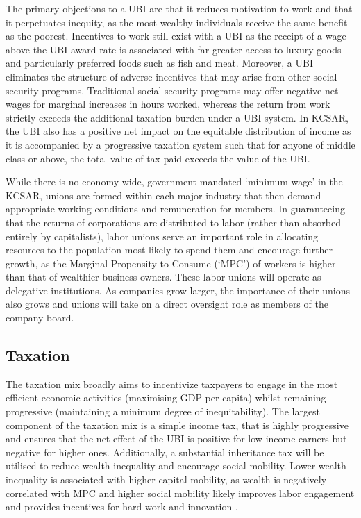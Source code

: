 \documentclass[fleqn,10pt]{Stylesheet} %
\begin{document}
The primary objections to a UBI are that it reduces motivation to work and that it perpetuates inequity, as the most wealthy individuals receive the same benefit as the poorest. Incentives to work still exist with a UBI as the receipt of a wage above the UBI award rate is associated with far greater access to luxury goods and particularly preferred foods such as fish and meat. Moreover, a UBI eliminates the structure of adverse incentives that may arise from other social security programs. Traditional social security programs may offer negative net wages for marginal increases in hours worked, whereas the return from work strictly exceeds the additional taxation burden under a UBI system. In KCSAR, the UBI also has a positive net impact on the equitable distribution of income as it is accompanied by a progressive taxation system such that for anyone of middle class or above, the total value of tax paid exceeds the value of the UBI. 

While there is no economy-wide, government mandated ‘minimum wage’ in the KCSAR, unions are formed within each major industry that then demand appropriate working conditions and remuneration for members. In guaranteeing that the returns of corporations are distributed to labor (rather than absorbed entirely by capitalists), labor unions serve an important role in allocating resources to the population most likely to spend them and encourage further growth, as the Marginal Propensity to Consume (‘MPC’) of workers is higher than that of wealthier business owners. These labor unions will operate as delegative institutions. As companies grow larger, the importance of their unions also grows and unions will take on a direct oversight role as members of the company board. 

\subsection{Taxation}
The taxation mix broadly aims to incentivize taxpayers to engage in the most efficient economic activities (maximising GDP per capita) whilst remaining progressive (maintaining a minimum degree of inequitability). The largest component of the taxation mix is a simple income tax, that is highly progressive and ensures that the net effect of the UBI is positive for low income earners but negative for higher ones. Additionally, a substantial inheritance tax will be utilised to reduce wealth inequality and encourage social mobility. Lower wealth inequality is associated with higher capital mobility, as wealth is negatively correlated with MPC and higher social mobility likely improves labor engagement and provides incentives for hard work and innovation \cite{Brueckner-2018}.
\end{document}
